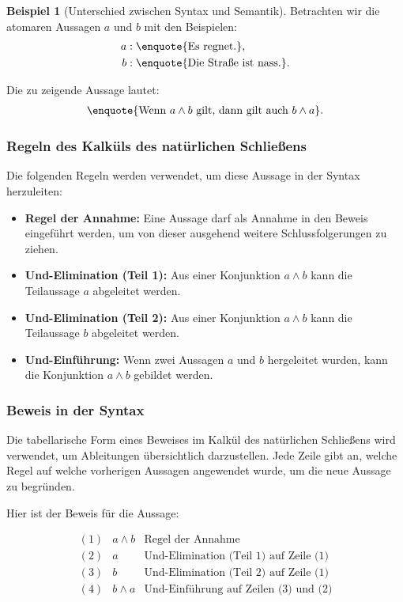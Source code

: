\documentclass{book}
\theoremstyle{plain}
\theoremstyle{remark}
\theoremstyle{definition}
\newtheorem*{example}{Beispiel}
\begin{document}
\begin{example}[Unterschied zwischen Syntax und Semantik]
Betrachten wir die atomaren Aussagen \(a\) und \(b\) mit den Beispielen:
\begin{align*}
    a &: \text{\enquote{Es regnet.}}, \\
    b &: \text{\enquote{Die Straße ist nass.}}.
\end{align*}

Die zu zeigende Aussage lautet:
\begin{align*}
    \text{\enquote{Wenn \(a \land b\) gilt, dann gilt auch \(b \land a\)}}.
\end{align*}

\subsubsection*{Regeln des Kalküls des natürlichen Schließens}
Die folgenden Regeln werden verwendet, um diese Aussage in der Syntax herzuleiten:
\begin{itemize}
    \item \textbf{Regel der Annahme:} Eine Aussage darf als Annahme in den Beweis eingeführt werden, um von dieser ausgehend weitere Schlussfolgerungen zu ziehen.
    \item \textbf{Und-Elimination (Teil 1):} Aus einer Konjunktion \(a \land b\) kann die Teilaussage \(a\) abgeleitet werden.
    \item \textbf{Und-Elimination (Teil 2):} Aus einer Konjunktion \(a \land b\) kann die Teilaussage \(b\) abgeleitet werden.
    \item \textbf{Und-Einführung:} Wenn zwei Aussagen \(a\) und \(b\) hergeleitet wurden, kann die Konjunktion \(a \land b\) gebildet werden.
\end{itemize}

\subsubsection*{Beweis in der Syntax}
Die tabellarische Form eines Beweises im Kalkül des natürlichen Schließens wird verwendet, um Ableitungen übersichtlich darzustellen. Jede Zeile gibt an, welche Regel auf welche vorherigen Aussagen angewendet wurde, um die neue Aussage zu begründen.

Hier ist der Beweis für die Aussage:

\[
\begin{array}{lll}
    (1) & a \land b & \text{Regel der Annahme} \\
    (2) & a & \text{Und-Elimination (Teil 1) auf Zeile (1)} \\
    (3) & b & \text{Und-Elimination (Teil 2) auf Zeile (1)} \\
    (4) & b \land a & \text{Und-Einführung auf Zeilen (3) und (2)} \\
\end{array}
\]


\end{example}
\end{document}
